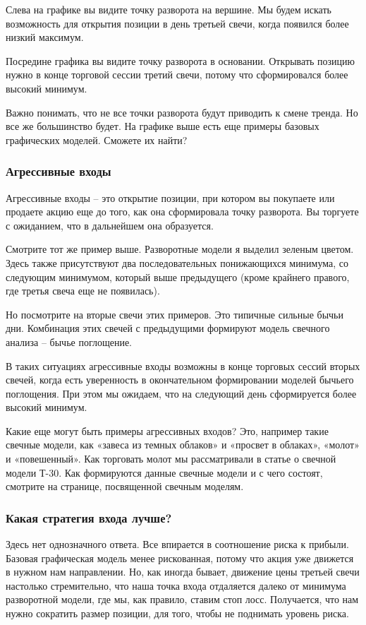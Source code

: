 \documentclass{book}
\begin{document}
Слева на графике вы видите точку разворота на вершине. Мы будем искать возможность для открытия позиции в день третьей свечи, когда появился более низкий максимум.

Посредине графика вы видите точку разворота в основании. Открывать позицию нужно в конце торговой сессии третий свечи, потому что сформировался более высокий минимум.

Важно понимать, что не все точки разворота будут приводить к смене
тренда. Но все же большинство будет. На графике выше есть еще примеры
базовых графических моделей. Сможете их найти?

\subsubsection{Агрессивные входы}

Агрессивные входы – это открытие позиции, при котором вы покупаете или продаете акцию еще до того, как она сформировала точку разворота. Вы торгуете с ожиданием, что в дальнейшем она образуется.

Смотрите тот же пример выше. Разворотные модели я выделил зеленым цветом. Здесь также присутствуют два последовательных понижающихся минимума, со следующим минимумом, который выше предыдущего (кроме крайнего правого, где третья свеча еще не появилась).

Но посмотрите на вторые свечи этих примеров. Это типичные сильные бычьи дни. Комбинация этих свечей с предыдущими формируют модель свечного анализа – бычье поглощение.

В таких ситуациях агрессивные входы возможны в конце торговых сессий вторых свечей, когда есть уверенность в окончательном формировании моделей бычьего поглощения. При этом мы ожидаем, что на следующий день сформируется более высокий минимум.

Какие еще могут быть примеры агрессивных входов? Это, например такие
свечные модели, как «завеса из темных облаков» и «просвет в облаках»,
«молот» и «повешенный». Как торговать молот мы рассматривали в статье
о свечной модели Т-30. Как формируются данные свечные модели и с чего
состоят, смотрите на странице, посвященной свечным моделям.

\subsubsection{Какая стратегия входа лучше?}

Здесь нет однозначного ответа. Все впирается в соотношение риска к прибыли. Базовая графическая модель менее рискованная, потому что акция уже движется в нужном нам направлении. Но, как иногда бывает, движение цены третьей свечи настолько стремительно, что наша точка входа отдаляется далеко от минимума разворотной модели, где мы, как правило, ставим стоп лосс. Получается, что нам нужно сократить размер позиции, для того, чтобы не поднимать уровень риска.
\end{document}
